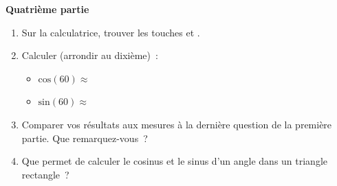 \documentclass[activite]{thedocument}
\begin{document}
{\bfseries\centering Quatrième partie\par}\noindent
\begin{enumerate}
    \item Sur la calculatrice, trouver les touches 
    et .
    \item Calculer (arrondir au dixième)~:
    \begin{itemize}
        \item $\text{cos}(60)\approx$
        \item $\text{sin}(60)\approx$
    \end{itemize}
    \item Comparer vos résultats aux mesures à la dernière question de la
    première partie. Que remarquez-vous~?
    \answerspace{3cm}
    \item Que permet de calculer le cosinus et le sinus d'un angle dans un triangle
    rectangle~?
    \answerspace{1.5cm}
\end{enumerate}
\end{document}
